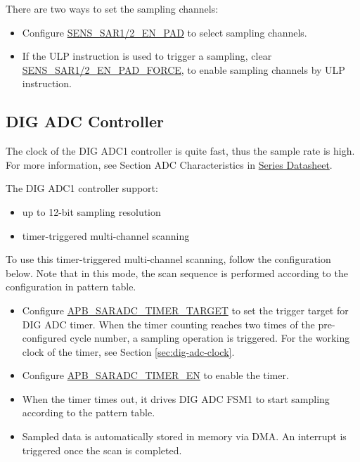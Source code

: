 \documentclass[main\_\_EN.tex]{subfiles}
\begin{document}
There are two ways to set the sampling channels:
\begin{itemize}
    \item Configure \hyperref[fielddesc:SENSSAR1ENPAD]{SENS\_SAR1/2\_EN\_PAD} to select sampling channels.
    \item If the ULP instruction is used to trigger a sampling, clear \hyperref[fielddesc:SENSSAR1ENPADFORCE]{SENS\_SAR1/2\_EN\_PAD\_FORCE}, to enable sampling channels by ULP instruction.
\end{itemize}

\subsection{DIG ADC Controller}

The clock of the DIG ADC1 controller is quite fast, thus the sample rate is high. For more information, see Section ADC Characteristics in \href{https://www.espressif.com/sites/default/files/documentation/esp32-s3_datasheet_en.pdf}{\chipname{} Series Datasheet}.

The DIG ADC1 controller support:

\begin{itemize}
    \item up to 12-bit sampling resolution
    \item timer-triggered multi-channel scanning
\end{itemize}

To use this timer-triggered multi-channel scanning, follow the configuration below. Note that in this mode, the scan sequence is performed according to the configuration in pattern table.

\begin{itemize}
        \item Configure  \hyperref[fielddesc:APBSARADCTIMERTARGET]{APB\_SARADC\_TIMER\_TARGET} to set the trigger target for DIG ADC timer. When the timer counting reaches two times of the pre-configured cycle number, a sampling operation is triggered. For the working clock of the timer, see Section \ref{sec:dig-adc-clock}.
        \item Configure  \hyperref[fielddesc:APBSARADCTIMEREN]{APB\_SARADC\_TIMER\_EN} to enable the timer.
        \item When the timer times out, it drives DIG ADC FSM1 to start sampling according to the pattern table.
        \item Sampled data is automatically stored in memory via DMA. An interrupt is triggered once the scan is completed.
\end{itemize}
\end{document}
